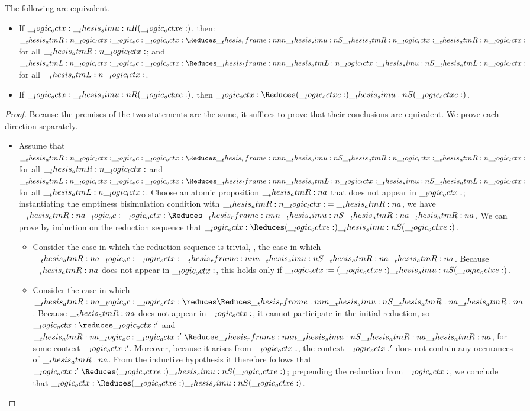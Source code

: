 \begin{theorem}\label{thm:emptiness-bisim-equiv}
  The following are equivalent.
  \begin{itemize}
  \item
    If $\__logic_octx: \__thesis_simu:n {R} (\__logic_octxe:)$, then: $\atmR{\lctx} \oc \octx \Reduces\rframe{\simu{S}}{\atmR{\lctx}} \atmR{\lctx}$ for all $\__thesis_atmR:n {\__logic_lctx:}$; and $\atmL{\lctx} \oc \octx \Reduces\lframe{\atmL{\lctx}}{\simu{S}} \atmL{\lctx}$ for all $\__thesis_atmL:n {\__logic_lctx:}$.
  \item
    If $\__logic_octx: \__thesis_simu:n {R} (\__logic_octxe:)$, then $\octx \Reduces (\octxe) \simu{S} (\octxe)$.
  \end{itemize}
\end{theorem}
\begin{proof}
  Because the premises of the two statements are the same, it suffices to prove that their conclusions are equivalent.
  We prove each direction separately.
  \begin{itemize}
  \item 
  Assume that $\atmR{\lctx} \oc \octx \Reduces\rframe{\simu{S}}{\atmR{\lctx}} \atmR{\lctx}$ for all $\__thesis_atmR:n {\__logic_lctx:}$ and $\atmL{\lctx} \oc \octx \Reduces\lframe{\atmL{\lctx}}{\simu{S}} \atmL{\lctx}$ for all $\__thesis_atmL:n {\__logic_lctx:}$.
  Choose an atomic proposition $\__thesis_atmR:n {a}$ that does not appear in $\__logic_octx:$; instantiating the emptiness bisimulation condition with $\__thesis_atmR:n {\__logic_lctx:} = \__thesis_atmR:n {a}$, we have $\atmR{a} \oc \octx \Reduces\rframe{\simu{S}}{\atmR{a}} \atmR{a}$.
  We can prove by induction on the reduction sequence that $\octx \Reduces (\octxe) \simu{S} (\octxe)$.
  \begin{itemize}
  \item
    Consider the case in which the reduction sequence is trivial, \ie, the case in which $\atmR{a} \oc \octx \rframe{\simu{S}}{\atmR{a}} \atmR{a}$.
    Because $\__thesis_atmR:n {a}$ does not appear in $\__logic_octx:$, this holds only if $\__logic_octx: = (\__logic_octxe:) \__thesis_simu:n {S} (\__logic_octxe:)$.

  \item
    Consider the case in which $\atmR{a} \oc \octx \reduces\Reduces\rframe{\simu{S}}{\atmR{a}} \atmR{a}$.
    Because $\__thesis_atmR:n {a}$ does not appear in $\__logic_octx:$, it cannot participate in the initial reduction, so $\octx \reduces \octx'$ and $\atmR{a} \oc \octx' \Reduces\rframe{\simu{S}}{\atmR{a}} \atmR{a}$, for some context $\__logic_octx:'$.
    Moreover, because it arises from $\__logic_octx:$, the context $\__logic_octx:'$ does not contain any occurances of $\__thesis_atmR:n {a}$.
    From the inductive hypothesis it therefore follows that $\octx' \Reduces (\octxe) \simu{S} (\octxe)$;
    prepending the reduction from $\__logic_octx:$, we conclude that $\octx \Reduces (\octxe) \simu{S} (\octxe)$.
  \end{itemize}


\end{itemize}
\end{proof}
